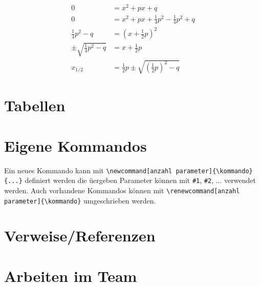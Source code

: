 \documentclass[a4paper, parskip=half]{scrartcl}
\begin{document}
\begin{align}
  0                  &= x^2 + px + q \\
  0                  &= x^2 + px + \frac{1}{4}p^2 - \frac{1}{4}p^2 + q \\
  \frac{1}{4}p^2 - q &= \left(x + \frac{1}{2}p \right)^2 \\
  \pm \sqrt{ \frac{1}{4}p^2 - q} &= x + \frac{1}{2}p \\
  x_{1/2}            &= \frac{1}{2}p \pm \sqrt{\left(\frac{1}{2}p\right)^2 - q}  
\end{align}
\section{Tabellen}
\section{Eigene Kommandos}\label{sec:customCommands}
Ein neues Kommando kann mit \verb+\newcommand[anzahl parameter]{\kommando}{...}+ definiert werden
die üergeben Parameter können mit \verb+#1+, \verb+#2+, ... verwendet werden. Auch vorhandene Kommandos
können mit \verb+\renewcommand[anzahl parameter]{\kommando}+ umgeschrieben werden. 
\section{Verweise/Referenzen}
\section{Arbeiten im Team}
\end{document}
